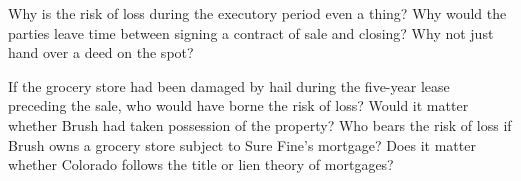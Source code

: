 
\item Why is the risk of loss during the executory period even a thing? Why
would the parties leave time between signing a contract of sale and closing?
Why not just hand over a deed on the spot?


\item If the grocery store had been damaged by hail during the five-year lease
preceding the sale, who would have borne the risk of loss? Would it matter
whether Brush had taken possession of the property? Who bears the risk of loss
if Brush owns a grocery store subject to Sure Fine's mortgage? Does it matter
whether Colorado follows the title or lien theory of mortgages?

